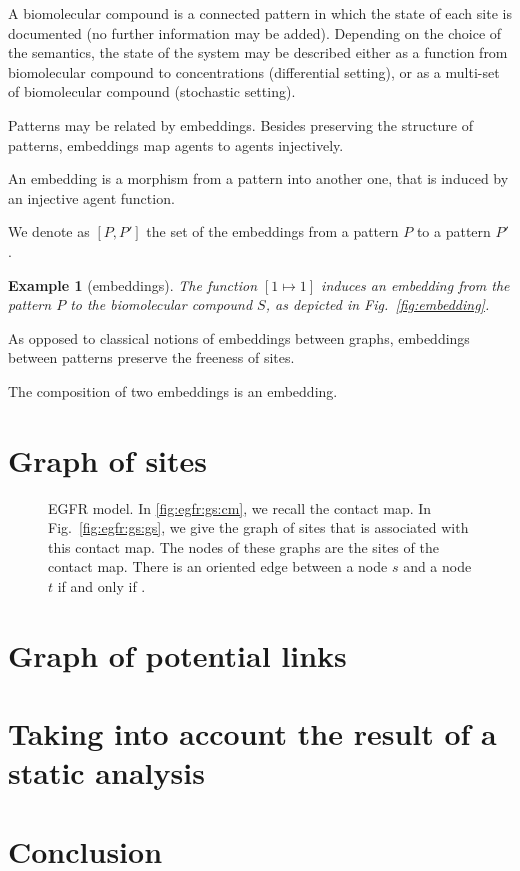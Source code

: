 \documentclass{entcs}
\newtheorem{myexample}[thm]{Example}
\begin{document}
A biomolecular compound is a connected pattern in which the state of each site is documented (no further information may be added). Depending on the choice of the semantics, the state of the system may be described either as a function from biomolecular compound to concentrations (differential setting), or as a multi-set of biomolecular compound  (stochastic setting).

Patterns may be related by embeddings. Besides preserving the structure of patterns, embeddings map agents to agents injectively.

\begin{defn}[embeddings]
  An embedding is a morphism from a pattern into another one, that is induced by an injective agent function.

  We denote as $[P,P']$ the set of the embeddings from a pattern $P$ to a pattern $P'$.
\end{defn}

\begin{myexample}[embeddings]
  The function $[1\mapsto 1]$ induces an embedding from the pattern $P$ to the biomolecular compound $S$, as depicted in Fig.~\ref{fig:embedding}. %
\end{myexample}

As opposed to classical notions of embeddings between graphs, embeddings between patterns preserve the freeness of sites.

The composition of two embeddings is an embedding.

\section{Graph of sites}

\begin{figure}
  \caption{EGFR model. In \ref{fig:egfr:gs:cm}, we recall the contact map.
  In Fig.~\ref{fig:egfr:gs:gs}, we give the graph of sites that is associated with this contact map. The nodes of these graphs are the sites of the contact map. There is an oriented edge between a node $s$ and a node $t$ if and only if . }
\end{figure}
\section{Graph of potential links}

\section{Taking into account the result of a static analysis}

\section{Conclusion}



\end{document}
